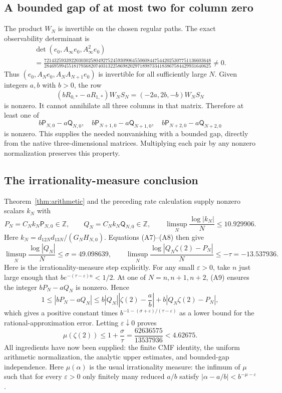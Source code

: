 \documentclass[11pt]{article}
\begin{document}
\subsection{A bounded gap of at most two for column zero}
The product $W_N$ is invertible on the chosen regular paths.  The exact
observability determinant is
\[
\begin{gathered}
 \det(e_0,A_\infty e_0,A_\infty^2e_0)
 \\
 =\frac{72143259339220303025804927524593090645506084475442025307751136603648}
 {28469599455181793682074031322586982029718987334183867584429931640625}
 \ne0.
\end{gathered}                                               \tag{A9}
\]
Thus $(e_0,A_Ne_0,A_NA_{N+1}e_0)$ is invertible for all sufficiently
large $N$.  Given integers $a,b$ with $b>0$, the row
\[
 (bR_{0,*}-aR_{1,*})W_NS_N=(-2a,2b,-b)W_NS_N
\]
is nonzero.  It cannot annihilate all three columns in that matrix.
Therefore at least one of
\[
 b\mathsf P_{N,0}-a\mathsf Q_{N,0},\quad
 b\mathsf P_{N+1,0}-a\mathsf Q_{N+1,0},\quad
 b\mathsf P_{N+2,0}-a\mathsf Q_{N+2,0}
\]
is nonzero.  This supplies the needed nonvanishing with a bounded
gap, directly from the native three-dimensional matrices.  Multiplying
each pair by any nonzero normalization preserves this property.

\subsection{The irrationality-measure conclusion}
Theorem~\ref{thm:arithmetic} and the preceding rate calculation supply nonzero scalars $k_N$ with
\[
 P_N=C_Nk_N\mathsf P_{N,0}\in\mathbb Z,\qquad
 Q_N=C_Nk_N\mathsf Q_{N,0}\in\mathbb Z,\qquad
 \limsup_N\frac{\log|k_N|}{N}\le10.929906.
                                                               \tag{A10}
\]
Here $k_N=d_{12N}d_{13N}/(G_NH_{N,0})$.
Equations (A7)--(A8) then give
\[
 \limsup_N\frac{\log|Q_N|}{N}\le\sigma=49.098639,
 \qquad
 \limsup_N\frac{\log|Q_N\zeta(2)-P_N|}{N}
 \le-\tau=-13.537936.
\]
Here is the irrationality-measure step explicitly.  For any small
$\varepsilon>0$, take $n$ just large enough that
$b e^{-(\tau-\varepsilon)n}<1/2$.  At one of $N=n,n+1,n+2$, (A9)
ensures the integer $bP_N-aQ_N$ is nonzero.  Hence
\[
 1\le |bP_N-aQ_N|
 \le b|Q_N|\left|\zeta(2)-\frac ab\right|
          +b|Q_N\zeta(2)-P_N|,
\]
which gives a positive constant times
$b^{-1-(\sigma+\varepsilon)/(\tau-\varepsilon)}$ as a lower bound
for the rational-approximation error.  Letting $\varepsilon\downarrow0$
proves
\[
 \boxed{\quad\mu(\zeta(2))\le1+\frac\sigma\tau
   =\frac{62636575}{13537936}<4.62675.\quad}
\]
All ingredients have now been supplied: the finite CMF identity, the uniform arithmetic normalization, the analytic upper estimates, and bounded-gap independence. Here $\mu(\alpha)$ is the usual irrationality measure: the infimum of $\mu$ such that for every $\varepsilon>0$ only finitely many reduced $a/b$ satisfy $|\alpha-a/b|<b^{-\mu-\varepsilon}$.
\end{document}
